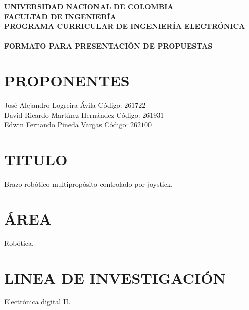 \documentclass[10pt,graphicx,caption,rotating]{article}
\begin{document}
\date{}
{\centering \textbf{ \Large {UNIVERSIDAD NACIONAL DE COLOMBIA \\
FACULTAD DE INGENIERÍA\[\]}}}
\textbf{ \Large {PROGRAMA CURRICULAR DE INGENIERÍA ELECTRÓNICA}} \\ \\
\textbf{ \Large {FORMATO PARA PRESENTACIÓN DE PROPUESTAS}}

\section{PROPONENTES}
\noindent
José Alejandro Logreira Ávila Código: $261722$\\
David Ricardo Martínez Hernández Código: $261931$\\
Edwin Fernando Pineda Vargas Código: $262100$

\section{TITULO}
\noindent
Brazo robótico multipropósito controlado por joystick.

\section{ÁREA}
\noindent
Robótica.

\section{LINEA DE INVESTIGACIÓN}
Electrónica digital II.
\end{document}
